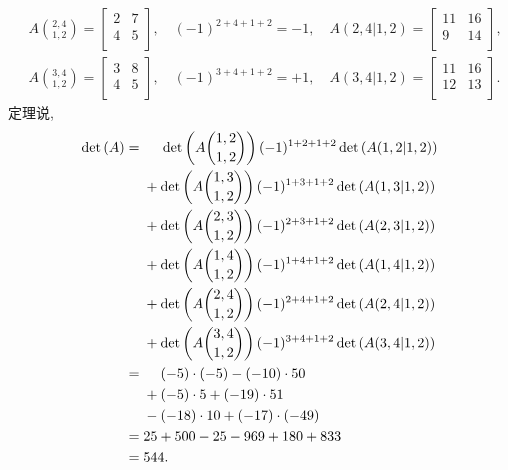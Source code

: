 \begin{example}
\begin{align*}
         & A\binom{2,4}{1,2}
        = \begin{bmatrix}2&7\\4&5\\ \end{bmatrix},
        \quad
        (-1)^{2+4+1+2} = -1,
        \quad
        A(2,4|1,2)
        = \begin{bmatrix}11&16\\9&14\\ \end{bmatrix},  \\
         & A\binom{3,4}{1,2}
        = \begin{bmatrix}3&8\\4&5\\ \end{bmatrix},
        \quad
        (-1)^{3+4+1+2} = +1,
        \quad
        A(3,4|1,2)
        = \begin{bmatrix}11&16\\12&13\\ \end{bmatrix}.
    \end{align*}
    定理说,
    \begin{align*}
        \det {(A)}
        = {} & \hphantom{{} + {}}
        \det {\left( A\binom{1,2}{1,2} \right)}\,
        (-1)^{1+2+1+2} \det {(A(1,2|1,2))}
        \\
             & + \det {\left( A\binom{1,3}{1,2} \right)}\,
        (-1)^{1+3+1+2} \det {(A(1,3|1,2))}
        \\
             & + \det {\left( A\binom{2,3}{1,2} \right)}\,
        (-1)^{2+3+1+2} \det {(A(2,3|1,2))}
        \\
             & + \det {\left( A\binom{1,4}{1,2} \right)}\,
        (-1)^{1+4+1+2} \det {(A(1,4|1,2))}
        \\
             & + \det {\left( A\binom{2,4}{1,2} \right)}\,
        (-1)^{2+4+1+2} \det {(A(2,4|1,2))}
        \\
             & + \det {\left( A\binom{3,4}{1,2} \right)}\,
        (-1)^{3+4+1+2} \det {(A(3,4|1,2))}
        \\
        = {} & \hphantom{{} + {}}
        (-5) \cdot (-5) - (-10) \cdot 50
        \\
             & + (-5) \cdot 5 + (-19) \cdot 51
        \\
             & - (-18) \cdot 10 + (-17) \cdot (-49)
        \\
        = {} & 25 + 500 - 25 - 969 + 180 + 833
        \\
        = {} & 544.
    \end{align*}
\end{example}

